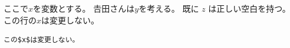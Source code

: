 \documentclass{article}
\begin{document}
ここで$x$を変数とする。
𠮷田さんは\(y\)を考える。
既に $z$ は正しい空白を持つ。
この行の$x$は変更しない。 %
\begin{verbatim}
この$x$は変更しない。
\end{verbatim}
\end{document}
